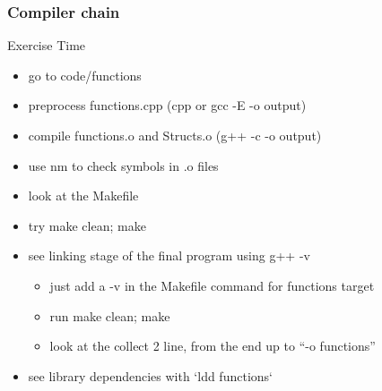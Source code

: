 \begin{frame}[fragile]
  \frametitle{Compiler chain}
  \begin{alertblock}{Exercise Time}
    \begin{itemize}
    \item go to code/functions
    \item preprocess functions.cpp (cpp or gcc -E -o output)
    \item compile functions.o and Structs.o (g++ -c -o output)
    \item use nm to check symbols in .o files
    \item look at the Makefile
    \item try make clean; make
    \item see linking stage of the final program using g++ -v
      \begin{itemize}
      \item just add a -v in the Makefile command for functions target
      \item run make clean; make
      \item look at the collect 2 line, from the end up to ``-o functions''
      \end{itemize}
    \item see library dependencies with `ldd functions`
    \end{itemize}
  \end{alertblock}
\end{frame}
